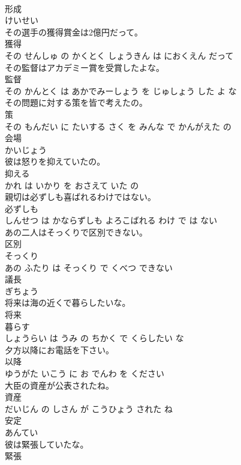 \documentclass[8pt]{extreport}
\begin{document}
\begin{CJK}{UTF8}{min}
\\	形成	
\\	けいせい			
\\	その選手の獲得賞金は2億円だって。	
\\	獲得 
\\	その せんしゅ の かくとく しょうきん は におくえん だって			
\\	その監督はアカデミー賞を受賞したよな。	
\\	監督 
\\	その かんとく は あかでみーしょう を じゅしょう した よ な			
\\	その問題に対する策を皆で考えたの。	
\\	策 
\\	その もんだい に たいする さく を みんな で かんがえた の			
\\	会場	
\\	かいじょう			
\\	彼は怒りを抑えていたの。	
\\	抑える 
\\	かれ は いかり を おさえて いた の			
\\	親切は必ずしも喜ばれるわけではない。	
\\	必ずしも 
\\	しんせつ は かならずしも よろこばれる わけ で は ない			
\\	あの二人はそっくりで区別できない。	
\\	区別 
\\	そっくり 
\\	あの ふたり は そっくり で くべつ できない			
\\	議長	
\\	ぎちょう			
\\	将来は海の近くで暮らしたいな。	
\\	将来 
\\	暮らす 
\\	しょうらい は うみ の ちかく で くらしたい な			
\\	夕方以降にお電話を下さい。	
\\	以降 
\\	ゆうがた いこう に お でんわ を ください			
\\	大臣の資産が公表されたね。	
\\	資産 
\\	だいじん の しさん が こうひょう された ね			
\\	安定	
\\	あんてい			
\\	彼は緊張していたな。	
\\	緊張 

\end{CJK}
\end{document}
